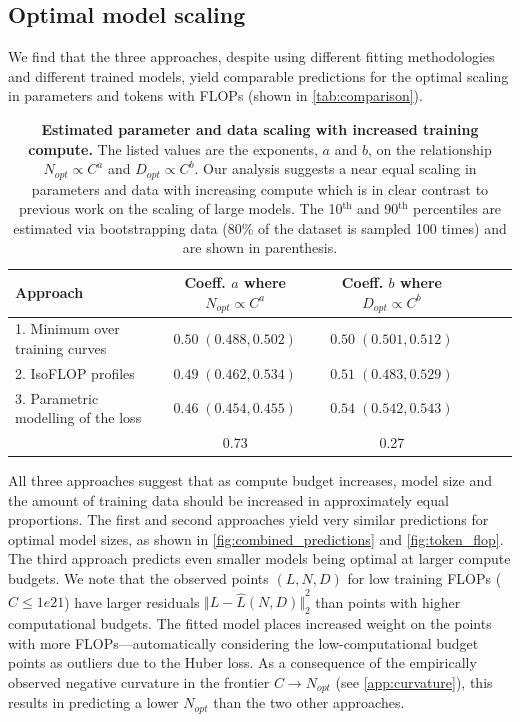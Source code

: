 \documentclass[11pt, a4paper, logo, copyright, nonumbering]{deepmind}
\begin{document}
\subsection{Optimal model scaling}
\label{sec:scaling-results}
We find that the three approaches, despite using different fitting methodologies and different trained models, yield comparable predictions for the optimal scaling in parameters and tokens with FLOPs (shown in \autoref{tab:comparison}).
\begin{table}[t]
    \caption{\textbf{Estimated parameter and data scaling with increased training compute.} 
    The listed values are the exponents, $a$ and $b$, on the relationship $N_{opt} \propto C^a$ and $D_{opt} \propto C^b$.
    Our analysis suggests a near equal scaling in parameters and data with increasing compute which is in clear contrast to previous work on the scaling of large models.
    The 10$^{\text{th}}$ and 90$^{\text{th}}$ percentiles are estimated via bootstrapping data (80\% of the dataset is sampled 100 times) and are shown in parenthesis.
    }
    \centering
    \begin{tabular}{lccccc}
    \toprule
    Approach & Coeff. $a$ where $N_{opt} \propto C^a$ & Coeff. $b$ where $D_{opt} \propto C^b$ \\
     \midrule
    1. Minimum over training curves & $0.50 \; ({0.488}, {0.502})$ & $0.50 \; (0.501, 0.512)$ \\ 
    2. IsoFLOP profiles & $0.49 \; (0.462, 0.534)$ &  $0.51 \; (0.483, 0.529)$ \\ 
    3. Parametric modelling of the loss & $0.46\; (0.454, 0.455)$ & $0.54  \; (0.542, 0.543)$ \\ 
    \midrule
    \citet{kaplan2020scaling} & 0.73 & 0.27 \\ 
    \bottomrule
    \end{tabular}
    \label{tab:comparison}
\end{table}
All three approaches suggest that as compute budget increases, model size and the amount of training data should be increased in approximately equal proportions.
The first and second approaches yield very similar predictions for optimal model sizes, as shown in \autoref{fig:combined_predictions} and \autoref{fig:token_flop}.
The third approach predicts even smaller models being optimal at larger compute budgets.
We note that the observed points $(L, N, D)$ for low training FLOPs ($C\leq1e21$) have larger residuals ${\Vert L - \hat L(N, D) \Vert}_2^2$ than points with higher computational budgets.
The fitted model places increased weight on the points with more FLOPs---automatically considering the low-computational budget points as outliers due to the Huber loss.
As a consequence of the empirically observed negative curvature in the frontier $C \to N_{opt}$ (see \autoref{app:curvature}), this results in predicting a lower $N_{opt}$ than the two other approaches.
\end{document}
